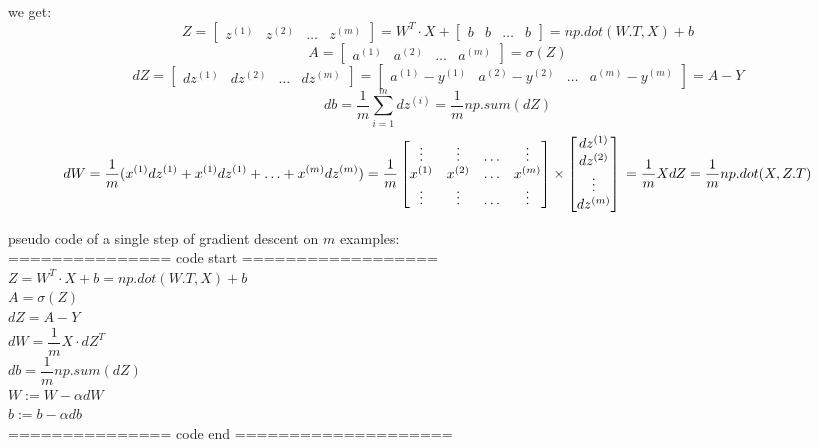 we get:
$$Z = \begin{bmatrix}z^{(1)} & z^{(2)} & \ldots & z^{(m)}\end{bmatrix} = W^T \cdot X + \begin{bmatrix}b & b & \ldots & b\end{bmatrix} = np.dot(W.T, X) + b$$
$$A = \begin{bmatrix}a^{(1)} & a^{(2)} & \ldots & a^{(m)}\end{bmatrix} = \sigma(Z)$$
$$
dZ
= \begin{bmatrix}dz^{(1)} & dz^{(2)} & \ldots & dz^{(m)}\end{bmatrix}
= \begin{bmatrix}a^{(1)} - y^{(1)} & a^{(2)} - y^{(2)} & \ldots & a^{(m)} - y^{(m)}\end{bmatrix}
= A - Y
$$
$$db = \dfrac{1}{m} \sum_{i = 1}^m dz^{(i)} = \dfrac{1}{m} np.sum(dZ)$$
$$
dW
= \dfrac{1}{m} (x^{(1)} dz^{(1)} + x^{(1)} dz^{(1)} + \ldots + x^{(m)} dz^{(m)})
= \dfrac{1}{m}
  \begin{bmatrix}
	\vdots & \vdots & \ldots & \vdots \\
	x^{(1)} & x^{(2)} & \ldots & x^{(m)} \\
	\vdots & \vdots & \ldots & \vdots
  \end{bmatrix}
  \times
  \begin{bmatrix}
	  dz^{(1)} \\
	  dz^{(2)} \\
	  \vdots \\
	  dz^{(m)} \\
  \end{bmatrix} \\
= \dfrac{1}{m} X dZ \\
= \dfrac{1}{m} np.dot(X, Z.T)
$$

pseudo code of a single step of gradient descent on $m$ examples: \\
=============== code start ================== \\
$Z = W^T \cdot X + b = np.dot(W.T, X) + b$ \\
$A = \sigma(Z)$ \\
$dZ = A - Y$ \\
$dW = \dfrac{1}{m} X \cdot dZ^T$ \\
$db = \dfrac{1}{m} np.sum(dZ)$ \\
$W := W - \alpha dW$ \\
$b := b - \alpha db$ \\
=============== code end ====================

